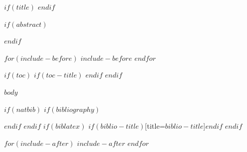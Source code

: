 \documentclass[$if(fontsize)$$fontsize$$else$11pt$endif$,$if(papersize)$$papersize$$else$a4paper$endif$]{article}
\begin{document}
$if(title)$
\RenderflowMakeTitle
$endif$

$if(abstract)$
\begin{abstract}
$abstract$
\end{abstract}
\vspace{1em}
$endif$

$for(include-before)$
$include-before$
$endfor$

$if(toc)$
$if(toc-title)$
\renewcommand*\contentsname{$toc-title$}
$endif$
\setcounter{tocdepth}{$if(toc-depth)$$toc-depth$$else$3$endif$}
\tableofcontents
\newpage
$endif$

$body$

$if(natbib)$
$if(bibliography)$

$endif$
$endif$
$if(biblatex)$
\printbibliography$if(biblio-title)$[title=$biblio-title$]$endif$
$endif$

$for(include-after)$
$include-after$
$endfor$
\end{document}
